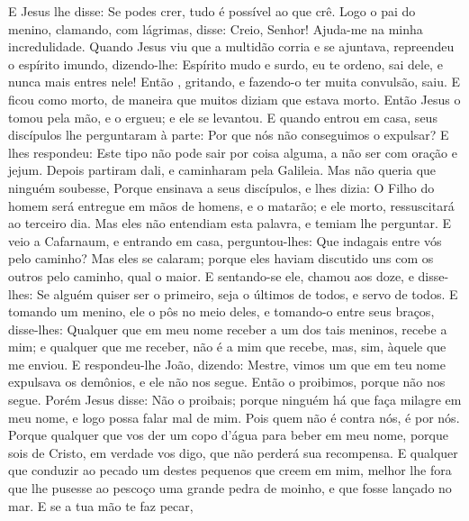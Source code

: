 {  E Jesus lhe disse: Se podes crer, tudo é possível ao que crê.
  Logo o pai do menino, clamando, com lágrimas, disse: Creio, Senhor! Ajuda-me na minha incredulidade.
  Quando Jesus viu que a multidão corria e se ajuntava, repreendeu o espírito imundo, dizendo-lhe: Espírito mudo e surdo, eu te ordeno, sai dele, e nunca mais entres nele!
  Então
{},  gritando, e fazendo-o ter muita convulsão, saiu. E
{} ficou como morto, de maneira que muitos diziam que estava morto.
  Então Jesus o tomou pela mão, e o ergueu; e ele se levantou.
  E quando entrou em casa, seus discípulos lhe perguntaram à parte: Por que nós não conseguimos o expulsar?
  E lhes respondeu: Este tipo não pode sair por coisa alguma, a não ser com oração e jejum.
  Depois partiram dali, e caminharam pela Galileia. Mas
{} não queria que ninguém soubesse,
  Porque ensinava a seus discípulos, e lhes dizia: O Filho do homem será entregue em mãos de homens, e o matarão; e
{} ele morto, ressuscitará ao terceiro dia.
  Mas eles não entendiam esta palavra, e temiam lhe perguntar.
  E veio a Cafarnaum, e entrando em casa, perguntou-lhes: Que indagais entre vós pelo caminho?
  Mas eles se calaram; porque eles haviam discutido uns com os outros pelo caminho, qual
{} o maior.
  E sentando-se ele, chamou aos doze, e disse-lhes: Se alguém quiser ser o primeiro, seja o últimos de todos, e servo de todos.
  E tomando um menino, ele o pôs no meio deles, e tomando-o entre seus braços, disse-lhes:
  Qualquer que em meu nome receber a um dos tais meninos, recebe a mim; e qualquer que me receber, não é a mim que recebe, mas, sim, àquele que me enviou.
  E respondeu-lhe João, dizendo: Mestre, vimos um que em teu nome expulsava os demônios, e ele não nos segue. Então o proibimos, porque não nos segue.
  Porém Jesus disse: Não o proibais; porque ninguém há que faça milagre em meu nome, e logo possa falar mal de mim.
  Pois quem não é contra nós, é por nós.
  Porque qualquer que vos der um copo d'água para beber em meu nome, porque sois de Cristo, em verdade vos digo, que não perderá sua recompensa.
  E qualquer que conduzir ao pecado
 um destes pequenos que creem em mim, melhor lhe fora que lhe pusesse ao pescoço uma grande pedra de moinho, e que fosse lançado no mar.
  E se a tua mão te faz pecar,
}
